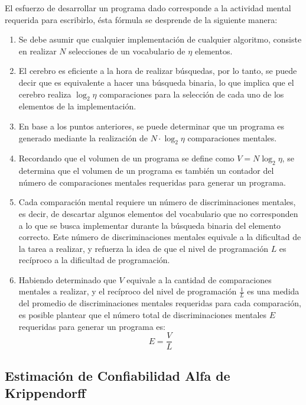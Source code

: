 \documentclass[letterpaper,12pt]{article}
\begin{document}
El esfuerzo de desarrollar un programa dado corresponde a la actividad mental requerida para escribirlo, ésta fórmula se desprende de la siguiente manera:

\begin{enumerate}
  \item Se debe asumir que cualquier implementación de cualquier algoritmo, consiste en realizar $N$ selecciones de un vocabulario de $\eta$ elementos.
  \item El cerebro es eficiente a la hora de realizar búsquedas, por lo tanto, se puede decir que es equivalente a hacer una búsqueda binaria, lo que implica que el cerebro realiza $\log_{2}\eta$ comparaciones para la selección de cada uno de los elementos de la implementación.
  \item En base a los puntos anteriores, se puede determinar que un programa es generado mediante la realización de $N \cdot \log_{2}\eta$ comparaciones mentales.
  \item Recordando que el volumen de un programa se define como $V = N\log_{2}\eta$, se determina que el volumen de un programa es también un contador del número de comparaciones mentales requeridas para generar un programa.
  \item Cada comparación mental requiere un número de discriminaciones mentales, es decir, de descartar algunos elementos del vocabulario que no corresponden a lo que se busca implementar durante la búsqueda binaria del elemento correcto. Este número de discriminaciones mentales equivale a la dificultad de la tarea a realizar, y refuerza la idea de que el nivel de programación $L$ es recíproco a la dificultad de programación.
  \item Habiendo determinado que $V$ equivale a la cantidad de comparaciones mentales a realizar, y el recíproco del nivel de programación $\frac{1}{L}$ es una medida del promedio de discriminaciones mentales requeridas para cada comparación, es posible plantear que el número total de discriminaciones mentales $E$ requeridas para generar un programa es:
        \begin{equation}
          E = \frac{V}{L}
        \end{equation}

\end{enumerate}

\subsection{Estimación de Confiabilidad Alfa de Krippendorff}
\end{document}
